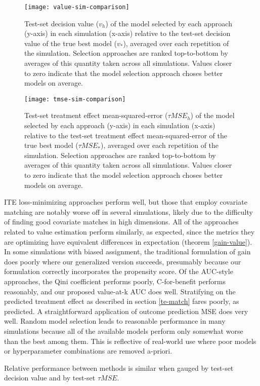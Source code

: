 \begin{figure}
\centering
\texttt{[image: value-sim-comparison]}
\caption{Test-set decision value ($v_h$) of the model selected by each approach (y-axis) in each simulation (x-axis) relative to the test-set decision value of the true best model ($v_*$), averaged over each repetition of the simulation. Selection approaches are ranked top-to-bottom by averages of this quantity taken across all simulations. Values closer to zero indicate that the model selection approach choses better models on average.}
\end{figure}

\begin{figure}
\centering
\texttt{[image: tmse-sim-comparison]}
\caption{Test-set treatment effect mean-squared-error ($\tau MSE_h$) of the model selected by each approach (y-axis) in each simulation (x-axis) relative to the test-set  treatment effect mean-squared-error of the true best model ($\tau MSE_*$), averaged over each repetition of the simulation. Selection approaches are ranked top-to-bottom by averages of this quantity taken across all simulations. Values closer to zero indicate that the model selection approach choses better models on average.}
\end{figure}

ITE loss-minimizing approaches perform well, but those that employ covariate matching are notably worse off in several simulations, likely due to the difficulty of finding good covariate matches in high dimensions. All of the approaches related to value estimation perform similarly, as expected, since the metrics they are optimizing have equivalent differences in expectation (theorem \ref{gain-value}). In some simulations with biased assignment, the traditional formulation of gain does poorly where our generalized version succeeds, presumably because our formulation correctly incorporates the propensity score. Of the AUC-style approaches, the Qini coefficient performs poorly, C-for-benefit performs reasonably, and our proposed value-at-k AUC does well. Stratifying on the predicted treatment effect as described in section \ref{te-match} fares poorly, as predicted. A straightforward application of outcome prediction MSE does very well. Random model selection leads to reasonable performance in many simulations because all of the available models perform only somewhat worse than the best among them. This is reflective of real-world use where poor models or hyperparameter combinations are removed a-priori. 

Relative performance between methods is similar when gauged by test-set decision value and by test-set $\tau MSE$. 
